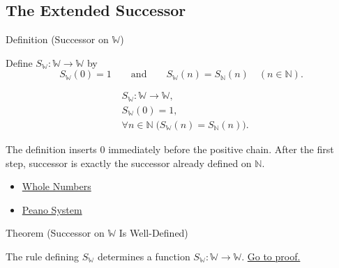 \subsection*{The Extended Successor}

\begin{definitionbox}{Definition (Successor on \texorpdfstring{$\mathbb{W}$}{W})}
\begin{definition}
\label{def:successor-on-w}
Define $S_{\mathbb{W}}:\mathbb{W}\to\mathbb{W}$ by
\[
S_{\mathbb{W}}(0)=1
\qquad\text{and}\qquad
S_{\mathbb{W}}(n)=S_{\mathbb{N}}(n)\quad(n\in\mathbb{N}).
\]
\end{definition}
\end{definitionbox}

\begin{remark*}
\[
\begin{aligned}
&S_{\mathbb{W}}:\mathbb{W}\to\mathbb{W},\\
&S_{\mathbb{W}}(0)=1,\\
&\forall n\in\mathbb{N}\;
  \bigl(S_{\mathbb{W}}(n)=S_{\mathbb{N}}(n)\bigr).
\end{aligned}
\]
\end{remark*}

\begin{remark*}[Interpretation]
The definition inserts $0$ immediately before the positive chain. After the
first step, successor is exactly the successor already defined on
$\mathbb{N}$.
\end{remark*}

\begin{dependencies}
\begin{itemize}
  \item \hyperref[def:whole-numbers]{Whole Numbers}
  \item \hyperref[def:peano-system]{Peano System}
\end{itemize}
\end{dependencies}

\begin{theorembox}{Theorem (Successor on \texorpdfstring{$\mathbb{W}$}{W} Is Well-Defined)}
\begin{theorem}
\label{thm:successor-on-w-well-defined}
The rule defining $S_{\mathbb{W}}$ determines a function
$S_{\mathbb{W}}:\mathbb{W}\to\mathbb{W}$.
\hyperref[prf:successor-on-w-well-defined]{Go to proof.}
\end{theorem}
\end{theorembox}

